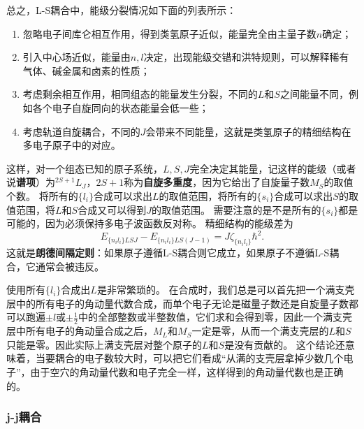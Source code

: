 \documentclass[UTF8, a4paper]{ctexart}
\begin{document}
总之，L-S耦合中，能级分裂情况如下面的列表所示：
\begin{enumerate}
    \item 忽略电子间库仑相互作用，得到类氢原子近似，能量完全由主量子数$n$确定；
    \item 引入中心场近似，能量由$n, l$决定，出现能级交错和洪特规则，可以解释稀有气体、碱金属和卤素的性质；
    \item 考虑剩余相互作用，相同组态的能量发生分裂，不同的$L$和$S$之间能量不同，例如各个电子自旋同向的状态能量会低一些；
    \item 考虑轨道自旋耦合，不同的$J$会带来不同能量，这就是类氢原子的精细结构在多电子原子中的对应。
\end{enumerate}
这样，对一个组态已知的原子系统，$L, S, J$完全决定其能量，记这样的能级（或者说\textbf{谱项}）为$^{2S+1} L_J$，$2S+1$称为\textbf{自旋多重度}，因为它给出了自旋量子数$M_S$的取值个数。
将所有的$\{l_i\}$合成可以求出$L$的取值范围，将所有的$\{s_i\}$合成可以求出$S$的取值范围，将$L$和$S$合成又可以得到$J$的取值范围。
需要注意的是不是所有的$\{s_i\}$都是可能的，因为必须保持多电子波函数反对称。
精细结构的能级差为
\begin{equation}
    E_{\{n_i l_i\} LSJ} - E_{\{n_i l_i\} LS(J-1)} = J \zeta_{\{n_i l_i\}} \hbar^2.
    \label{eq:lande-gapping}
\end{equation}
这就是\textbf{朗德间隔定则}：如果原子遵循L-S耦合则它成立，如果原子不遵循L-S耦合，它通常会被违反。

使用所有$\{l_i\}$合成出$L$是非常繁琐的。
在合成时，我们总是可以首先把一个满支壳层中的所有电子的角动量代数合成，而单个电子无论是磁量子数还是自旋量子数都可以跑遍$\pm l$或$\pm \frac{1}{2}$中的全部整数或半整数值，它们求和会得到零，因此一个满支壳层中所有电子的角动量合成之后，$M_L$和$M_S$一定是零，从而一个满支壳层的$L$和$S$只能是零。因此实际上满支壳层对整个原子的$L$和$S$是没有贡献的。
这个结论还意味着，当要耦合的电子数较大时，可以把它们看成“从满的支壳层拿掉少数几个电子”，由于空穴的角动量代数和电子完全一样，这样得到的角动量代数也是正确的。

\subsubsection{j-j耦合}\label{sec:jj-coupling}
\end{document}
